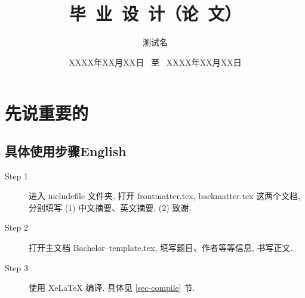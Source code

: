 \documentclass{NJUPTThesis}%
\begin{document}

\title{毕\ 业\ 设\ 计（论\ 文）}
\author{测试名}                            %
\date{XXXX年XX月XX日 \ 至 \ XXXX年XX月XX日}                    %

\maketitle
\frontmatter

\thispagestyle{empty}

\tableofcontents
\thispagestyle{empty}

\mainmatter %
\chapter{先说重要的}
 
 \section{具体使用步骤\textsf{English}}

 \begin{description}

  \item[Step 1]  进入 includefile 文件夹,  打开 frontmatter.tex, backmatter.tex 这两个文档,
        分别填写 (1) 中文摘要、英文摘要, (2) 致谢.

  \item[Step 2]  打开主文档 Bachelor--template.tex, 填写题目、作者等等信息, 书写正文.

  \item[Step 3]  使用 XeLaTeX 编译. 具体见 \ref{sec-compile} 节.


\end{description}
\end{document}
